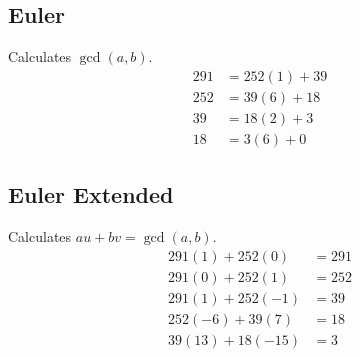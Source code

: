 \documentclass{article}
\begin{document}
\begin{multicols*}{2}
\subsection*{Euler}
Calculates $\gcd(a, b)$.
\begin{align*}
    291 &= 252(1) + 39 \\
    252 &= 39(6)  + 18 \\
    39  &= 18(2)  + \boxed{3} \\
    18  &= 3(6)   + 0
\end{align*}

\subsection*{Euler Extended}
Calculates $au + bv = \gcd(a, b)$.
\begin{align*}
    291(1)  + 252(0) &= 291 \\
    291(0)  + 252(1) &= 252 \\
    291(1)  + 252(-1) &= 39 \\
    252(-6) + 39(7)   &= 18 \\
    39(13)  + 18(-15) &= 3 \\
\end{align*}

\end{multicols*}
\pagebreak
\end{document}
